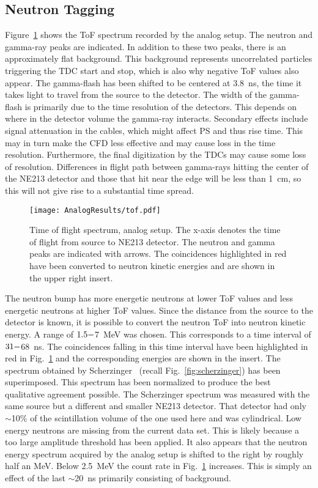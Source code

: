 \documentclass[main.tex]{subfiles}
\begin{document}
\subsection{Neutron Tagging}
Figure~\ref{fig:tof_a} shows the ToF spectrum recorded by the analog setup. The neutron and gamma-ray peaks are indicated. In addition to these two peaks, there is an approximately flat background. This background represents uncorrelated particles triggering the TDC start and stop, which is also why negative ToF values also appear.
The gamma-flash has been shifted to be centered at \SI{3.8}{ns}, the time it takes light to travel from the source to the detector. The width of the gamma-flash is primarily due to the time resolution of the detectors. This depends on where in the detector volume the gamma-ray interacts. Secondary effects include signal attenuation in the cables, which might affect PS and thus rise time. This may in turn make the CFD less effective and may cause loss in the time resolution. Furthermore, the final  digitization by the TDCs may cause some loss of resolution. Differences in flight path between gamma-rays hitting the center of the NE213 detector and those that hit near the edge will be less than \SI{1}{cm}, so this will not give rise to a substantial time spread. 
\begin{figure}[ht]
    \centering
        \texttt{[image: AnalogResults/tof.pdf]}
        \caption[Time of flight spectrum, analog setup.]{Time of flight spectrum, analog setup. The x-axis denotes the time of flight from source to NE213 detector. The neutron and gamma peaks are indicated with arrows. The coincidences highlighted in red have been converted to neutron kinetic energies and are shown in the upper right insert.}
    \label{fig:tof_a}
\end{figure}
The neutron bump has more energetic neutrons at lower ToF values and less energetic neutrons at higher ToF values. Since the distance from the source to the detector is known, it is possible to convert the neutron ToF into neutron kinetic energy. A range of $1.5\--$7~\si{\MeV} was chosen. This corresponds to a time interval of $31\--$\SI{68}{\ns}. The coincidences falling in this time interval have been highlighted in red in Fig.~\ref{fig:tof_a} and the corresponding energies are shown in the insert. The spectrum obtained by Scherzinger~\cite{ScherzingerPhd} (recall Fig.~\ref{fig:scherzinger}) has been superimposed. This spectrum has been normalized to produce the best qualitative agreement possible. The Scherzinger spectrum was measured with the same source but a different and smaller NE213 detector. That detector had only $\sim$10\% of the scintillation volume of the one used here and was cylindrical. 
Low energy neutrons are missing from the current data set. This is likely because a too large amplitude threshold has been applied. 
It also appears that the neutron energy spectrum acquired by the analog setup is shifted to the right by roughly half an MeV. Below \SI{2.5}{MeV} the count rate in Fig.~\ref{fig:tof_a} increases. This is simply an effect of the last $\sim$\SI{20}{\ns} primarily consisting of background.
\end{document}
